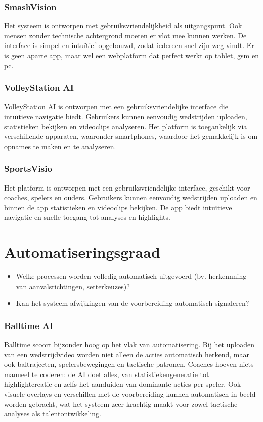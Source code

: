 \subsubsection{SmashVision}
Het systeem is ontworpen met gebruiksvriendelijkheid als uitgangspunt. Ook mensen zonder technische achtergrond moeten er vlot mee kunnen werken. De interface is simpel en intuïtief opgebouwd, zodat iedereen snel zijn weg vindt. Er is geen aparte app, maar wel een webplatform dat perfect werkt op tablet, gsm en pc.
\subsubsection{VolleyStation AI}
VolleyStation AI is ontworpen met een gebruiksvriendelijke interface die intuïtieve navigatie biedt. Gebruikers kunnen eenvoudig wedstrijden uploaden, statistieken bekijken en videoclips analyseren. Het platform is toegankelijk via verschillende apparaten, waaronder smartphones, waardoor het gemakkelijk is om opnames te maken en te analyseren. 
\subsubsection{SportsVisio}
Het platform is ontworpen met een gebruiksvriendelijke interface, geschikt voor coaches, spelers en ouders. Gebruikers kunnen eenvoudig wedstrijden uploaden en binnen de app statistieken en videoclips bekijken. De app biedt intuïtieve navigatie en snelle toegang tot analyses en highlights.

\section{Automatiseringsgraad}
\begin{itemize}
  \item Welke processen worden volledig automatisch uitgevoerd (bv. herkennning van aanvalsrichtingen, setterkeuzes)?
  \item Kan het systeem afwijkingen van de voorbereiding automatisch signaleren?
\end{itemize}
\subsubsection{Balltime AI}
Balltime scoort bijzonder hoog op het vlak van automatisering. Bij het uploaden van een wedstrijdvideo worden niet alleen de acties automatisch herkend, maar ook baltrajecten, spelersbewegingen en tactische patronen. Coaches hoeven niets manueel te coderen: de AI doet alles, van statistiekengeneratie tot highlightcreatie en zelfs het aanduiden van dominante acties per speler. Ook visuele overlays en verschillen met de voorbereiding kunnen automatisch in beeld worden gebracht, wat het systeem zeer krachtig maakt voor zowel tactische analyses als talentontwikkeling.
